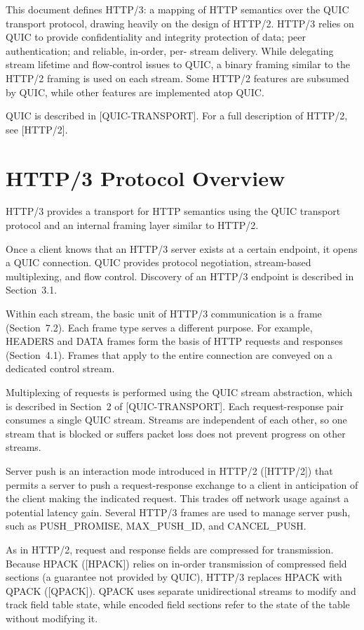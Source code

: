 \documentclass{article}
\begin{document}
This document defines HTTP/3: a mapping of HTTP semantics over the QUIC transport protocol, drawing heavily on the design of HTTP/2. HTTP/3 relies on QUIC to provide confidentiality and integrity protection of data; peer authentication; and reliable, in-order, per- stream delivery.  While delegating stream lifetime and flow-control issues to QUIC, a binary framing similar to the HTTP/2 framing is used on each stream.  Some HTTP/2 features are subsumed by QUIC, while other features are implemented atop QUIC.

QUIC is described in [QUIC-TRANSPORT].  For a full description of HTTP/2, see [HTTP/2].

\section{HTTP/3 Protocol Overview}

HTTP/3 provides a transport for HTTP semantics using the QUIC transport protocol and an internal framing layer similar to HTTP/2.

Once a client knows that an HTTP/3 server exists at a certain endpoint, it opens a QUIC connection.  QUIC provides protocol negotiation, stream-based multiplexing, and flow control.  Discovery of an HTTP/3 endpoint is described in Section~3.1.

Within each stream, the basic unit of HTTP/3 communication is a frame (Section~7.2).  Each frame type serves a different purpose.  For example, HEADERS and DATA frames form the basis of HTTP requests and responses (Section~4.1).  Frames that apply to the entire connection are conveyed on a dedicated control stream.

Multiplexing of requests is performed using the QUIC stream abstraction, which is described in Section~2 of [QUIC-TRANSPORT]. Each request-response pair consumes a single QUIC stream.  Streams are independent of each other, so one stream that is blocked or suffers packet loss does not prevent progress on other streams.

Server push is an interaction mode introduced in HTTP/2 ([HTTP/2]) that permits a server to push a request-response exchange to a client in anticipation of the client making the indicated request.  This trades off network usage against a potential latency gain.  Several HTTP/3 frames are used to manage server push, such as PUSH\_PROMISE, MAX\_PUSH\_ID, and CANCEL\_PUSH.

As in HTTP/2, request and response fields are compressed for transmission.  Because HPACK ([HPACK]) relies on in-order transmission of compressed field sections (a guarantee not provided by QUIC), HTTP/3 replaces HPACK with QPACK ([QPACK]).  QPACK uses separate unidirectional streams to modify and track field table state, while encoded field sections refer to the state of the table without modifying it.
\end{document}
